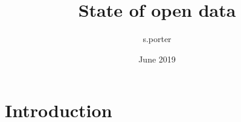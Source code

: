 \documentclass{article}
\title{State of open data}
\author{s.porter }
\date{June 2019}
\begin{document}
\maketitle

\section{Introduction}
\end{document}
